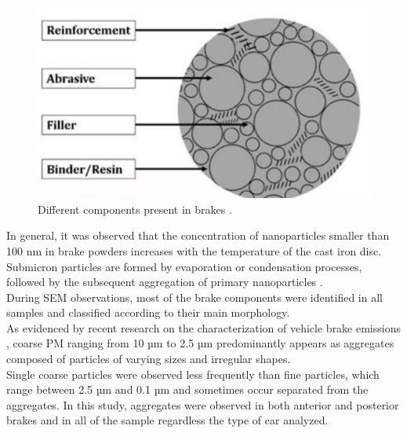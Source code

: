 \begin{figure}[H]
\centering
    \includegraphics[scale=0.85]{images/layers.png}
    \caption{Different components present in brakes \cite{irawan2022overview}.}
    \label{fig:Layers}
\end{figure}

In general, it was observed that the concentration of nanoparticles smaller than 100 nm in brake powders increases with the temperature of the cast iron disc. Submicron particles are formed by evaporation or condensation processes, followed by the subsequent aggregation of primary nanoparticles \cite{grigoratos2015brake}.\\
During SEM observations, most of the brake components were identified in all samples and classified according to their main morphology.\\

As evidenced by recent research on the characterization of vehicle brake emissions \cite{liati2019airborne}, coarse PM ranging from 10 µm to 2.5 µm predominantly appears as aggregates composed of particles of varying sizes and irregular shapes. \\
Single coarse particles were observed less frequently than fine particles, which range between 2.5 µm and 0.1 µm and sometimes occur separated from the aggregates.
In this study, aggregates were observed in both anterior and posterior brakes and in all of the sample regardless the type of car analyzed.

